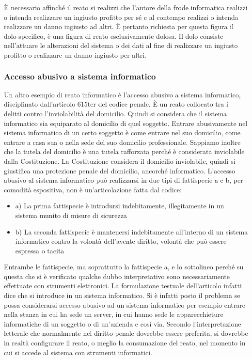 È necessario affinché il reato si realizzi che l'autore della frode informatica realizzi o intenda realizzare un ingiusto profitto per sé e al contempo realizzi o intenda realizzare un danno ingiusto ad altri. È pertanto richiesta per questa figura il dolo specifico, è una figura di reato esclusivamente dolosa. 
Il dolo consiste nell'attuare le alterazioni del sistema o dei dati al fine di realizzare un ingiusto profitto o realizzare un danno ingiusto per altri.

\subsubsection{Accesso abusivo a sistema informatico}
Un altro esempio di reato informatico è l'accesso abusivo a sistema informatico, disciplinato dall'articolo 615ter del codice penale. È un reato collocato tra i delitti contro l'inviolabilità del domicilio. Quindi si considera che il sistema informatico sia equiparato al domicilio di quel soggetto. Entrare abusivamente nel sistema informatico di un certo soggetto è come entrare nel suo domicilio, come entrare a casa sua o nella sede del suo domicilio professionale. Sappiamo inoltre che la tutela del domicilio è una tutela rafforzata perché è considerata inviolabile dalla Costituzione. 
La Costituzione considera il domicilio inviolabile, quindi si giustifica una protezione penale del domicilio, ancorché informatico. L'accesso abusivo al sistema informatico può realizzarsi in due tipi di fattispecie a e b, per comodità espositiva, non è un'articolazione fatta dal codice:

\begin{itemize}
    \item a) La prima fattispecie è introdursi indebitamente, illegitamente in un sistema munito di misure di sicurezza
    \item b) La seconda fattispecie è mantenersi indebitamente all'interno di un sistema informatico contro la volontà dell'avente diritto, volontà che può essere espressa o tacita
\end{itemize}

Entrambe le fattispecie, ma soprattutto la fattispecie a, e lo sottolineo perché su questa che si è verificato qualche dubbo interpretativo sono necessariamente effettuate con strumenti elettronici. La formulazione testuale dell'articolo infatti dice che si introduce in un sistema informatico. Si è infatti posto il problema se possa considerarsi accesso abusivo ad un sistema informatico per esempio entrare nella stanza in cui ha sede un server, in cui hanno sede le apparecchieture informatiche di un soggetto o di un'azienda e così via. Secondo l'interpretazione letterale che normalmente nel diritto penale dovrebbe essere preferita, si dovrebbe in realtà configurare il reato, o meglio la consumazione del reato, nel momento in cui si accede al sistema con strumenti informatici. 

